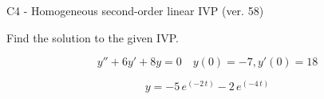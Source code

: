 \begin{exercise}
  \begin{exerciseTitle}C4 - Homogeneous second-order linear IVP (ver. 58)\end{exerciseTitle}
  \begin{exerciseStatement}
    
Find the solution to the given IVP.

    
\[y''+6y'+8y = 0 \hspace{1em} y(0) = -7 , y'(0) = 18\]

  \end{exerciseStatement}
  \begin{exerciseAnswer}
    
\[y= -5 \, e^{\left(-2 \, t\right)} - 2 \, e^{\left(-4 \, t\right)}\]

  \end{exerciseAnswer}
\end{exercise}